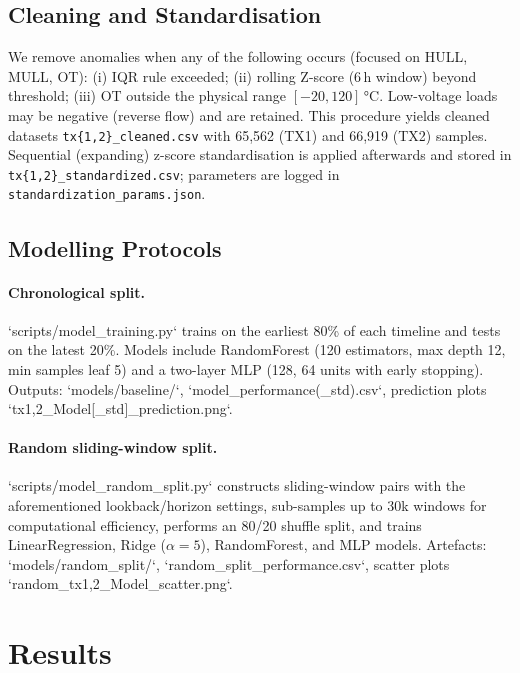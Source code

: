 \documentclass[11pt]{article}
\begin{document}
\subsection{Cleaning and Standardisation}
We remove anomalies when any of the following occurs (focused on HULL, MULL, OT): (i) IQR rule exceeded; (ii) rolling Z-score (6\,h window) beyond threshold; (iii) OT outside the physical range $[-20, 120]$\,°C. Low-voltage loads may be negative (reverse flow) and are retained. This procedure yields cleaned datasets \texttt{tx\{1,2\}\_cleaned.csv} with 65{,}562 (TX1) and 66{,}919 (TX2) samples. Sequential (expanding) z-score standardisation is applied afterwards and stored in \texttt{tx\{1,2\}\_standardized.csv}; parameters are logged in \texttt{standardization\_params.json}.

\subsection{Modelling Protocols}
\paragraph{Chronological split.}
`scripts/model_training.py` trains on the earliest 80\% of each timeline and tests on the latest 20\%. Models include RandomForest (120 estimators, max depth 12, min samples leaf 5) and a two-layer MLP (128, 64 units with early stopping). Outputs: `models/baseline/`, `model_performance(_std).csv`, prediction plots `tx{1,2}_{Model}[_std]_prediction.png`.

\paragraph{Random sliding-window split.}
`scripts/model_random_split.py` constructs sliding-window pairs with the aforementioned lookback/horizon settings, sub-samples up to 30k windows for computational efficiency, performs an 80/20 shuffle split, and trains LinearRegression, Ridge ($\alpha=5$), RandomForest, and MLP models. Artefacts: `models/random_split/`, `random_split_performance.csv`, scatter plots `random_tx{1,2}_{Model}_scatter.png`.

\section{Results}
\end{document}
